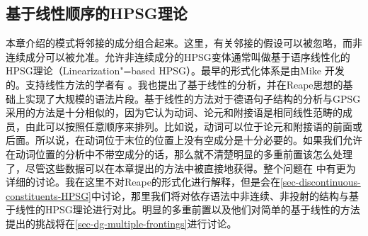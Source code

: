 \subsection{基于线性顺序的HPSG理论}
\label{sec-linearization-HPSG}

本章介绍的模式将邻接的成分组合起来。这里，有关邻接的假设可以被忽略，而非连续成分可以被允准。允许非连续成分的HPSG变体通常叫做基于语序线性化的HPSG理论（Linearization"=based HPSG）。最早的形式化体系是由Mike  \citet{Reape91,Reape92a,Reape94a}开发的。支持线性方法的学者有 \citet{Kathol95a,Kathol2000a,DS99a,RS99a,Crysmann2003c,BS2004a,Sato:06cluk,Wetta2011a}。我也提出了基于线性的分析\citep{Mueller99a,Mueller2002b}，并在Reape思想的基础上实现了大规模的语法片段\citep{Babel}。基于线性的方法对于德语句子结构的分析与GPSG采用的方法是十分相似的，因为它认为动词、论元和附接语是相同线性范畴的成员，由此可以按照任意顺序来排列。比如说，动词可以位于论元和附接语的前面或后面。所以说，在动词位于末位的位置上没有空成分是十分必要的。如果我们允许在动词位置的分析中不带空成分的话，那么就不清楚明显的多重前置该怎么处理了，尽管这些数据可以在本章提出的方法中被直接地获得。整个问题在 中有更为详细的讨论。我在这里不对Reape的形式化进行解释，但是会在\ref{sec-discontinuous-constituents-HPSG}中讨论，那里我们将对依存语法中非连续、非投射的结构与基于线性的HPSG理论进行对比。明显的多重前置以及他们对简单的基于线性的方法提出的挑战将在\ref{sec-dg-multiple-frontings}进行讨论。
